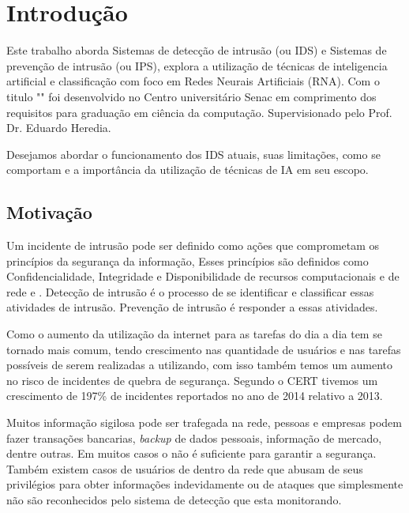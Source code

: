 
\chapter[Introdução]{Introdução}
Este trabalho aborda Sistemas de detecção de intrusão (\monoIDS ou IDS) e Sistemas de prevenção de intrusão (\monoIPS ou IPS), explora a utilização de técnicas de inteligencia artificial e classificação com foco em Redes Neurais Artificiais (RNA). Com o titulo "\monoTitulo"  foi desenvolvido no Centro universitário Senac em comprimento dos requisitos para graduação em ciência da computação. Supervisionado pelo Prof. Dr. Eduardo Heredia.

Desejamos abordar o funcionamento dos IDS atuais, suas limitações, como se comportam e a importância da utilização de técnicas de IA em seu escopo.
	
\section{Motivação}

Um incidente de intrusão pode ser definido como ações que comprometam os princípios da segurança da informação, Esses princípios são definidos como Confidencialidade, Integridade e Disponibilidade de recursos computacionais e de rede \cite{whitman2011principles} e \cite{beer2011cybercrime}.  
Detecção de intrusão é o processo de se identificar e classificar essas atividades de intrusão. Prevenção de intrusão é responder a essas atividades.

Como o aumento da utilização da internet para  as tarefas do dia a dia tem se tornado mais comum, tendo crescimento nas quantidade de usuários e nas tarefas possíveis de serem realizadas a utilizando, com isso também temos um aumento no risco de incidentes de quebra de segurança. Segundo o CERT \cite{CERT} tivemos um crescimento de 197\% de incidentes reportados no ano de 2014 relativo a 2013. 

Muitos informação sigilosa pode ser trafegada na rede, pessoas e empresas podem fazer transações bancarias, \textit{backup} de dados pessoais, informação de mercado, dentre outras. Em muitos casos o \monoFireWall não é suficiente para garantir a segurança. Também existem casos de usuários de dentro da rede que abusam de seus privilégios para obter informações indevidamente ou de ataques que simplesmente não são reconhecidos pelo sistema de detecção que esta monitorando.

